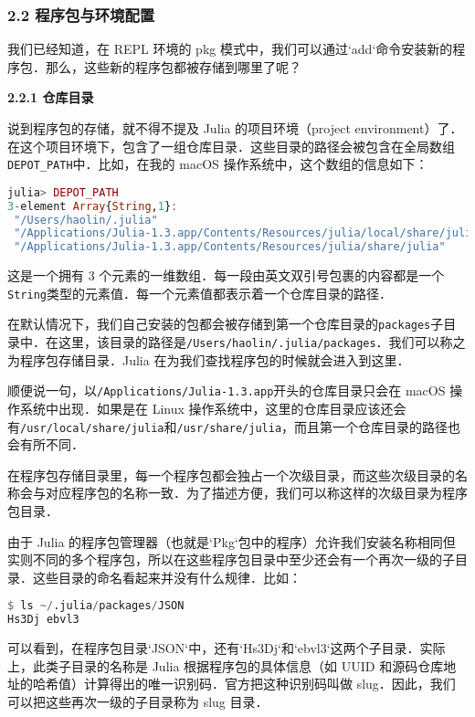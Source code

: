 
\subsubsection{2.2 程序包与环境配置}

我们已经知道，在 REPL 环境的 pkg 模式中，我们可以通过`add`命令安装新的程序包．那么，这些新的程序包都被存储到哪里了呢？

\textbf{2.2.1 仓库目录}

说到程序包的存储，就不得不提及 Julia 的项目环境（project environment）了．在这个项目环境下，包含了一组仓库目录．这些目录的路径会被包含在全局数组\verb|DEPOT_PATH|中．比如，在我的 macOS 操作系统中，这个数组的信息如下：

\begin{lstlisting}[language=julia]
julia> DEPOT_PATH
3-element Array{String,1}:
 "/Users/haolin/.julia"                                                  
 "/Applications/Julia-1.3.app/Contents/Resources/julia/local/share/julia"
 "/Applications/Julia-1.3.app/Contents/Resources/julia/share/julia" 
\end{lstlisting}

这是一个拥有 3 个元素的一维数组．每一段由英文双引号包裹的内容都是一个\verb|String|类型的元素值．每一个元素值都表示着一个仓库目录的路径．

在默认情况下，我们自己安装的包都会被存储到第一个仓库目录的\verb|packages|子目录中．在这里，该目录的路径是\verb|/Users/haolin/.julia/packages|．我们可以称之为程序包存储目录．Julia 在为我们查找程序包的时候就会进入到这里．

顺便说一句，以\verb|/Applications/Julia-1.3.app|开头的仓库目录只会在 macOS 操作系统中出现．如果是在 Linux 操作系统中，这里的仓库目录应该还会有\verb|/usr/local/share/julia|和\verb|/usr/share/julia|，而且第一个仓库目录的路径也会有所不同．

在程序包存储目录里，每一个程序包都会独占一个次级目录，而这些次级目录的名称会与对应程序包的名称一致．为了描述方便，我们可以称这样的次级目录为程序包目录．

由于 Julia 的程序包管理器（也就是`Pkg`包中的程序）允许我们安装名称相同但实则不同的多个程序包，所以在这些程序包目录中至少还会有一个再次一级的子目录．这些目录的命名看起来并没有什么规律．比如：

\begin{lstlisting}[language=julia]
$ ls ~/.julia/packages/JSON
Hs3Dj ebvl3
\end{lstlisting}

可以看到，在程序包目录`JSON`中，还有`Hs3Dj`和`ebvl3`这两个子目录．实际上，此类子目录的名称是 Julia 根据程序包的具体信息（如 UUID 和源码仓库地址的哈希值）计算得出的唯一识别码．官方把这种识别码叫做 slug．因此，我们可以把这些再次一级的子目录称为 slug 目录．


